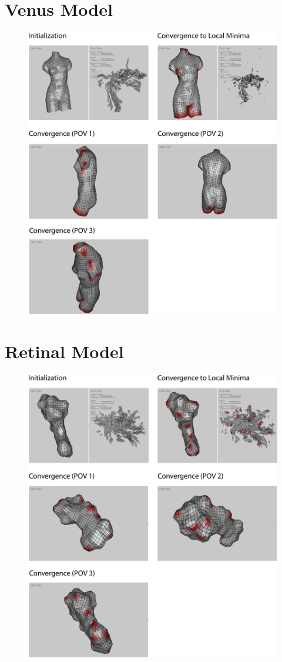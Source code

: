 \section{Venus Model}
\begin{figure}[ht]
\centering
\includegraphics[width=14cm]{figures/results/venus.png}
\caption[Venus Model]{}
\end{figure}
\newpage
\section{Retinal Model}
\begin{figure}[ht]
\centering
\includegraphics[width=14cm]{figures/results/retinal.png}
\caption[Retinal Model]{}
\end{figure}
